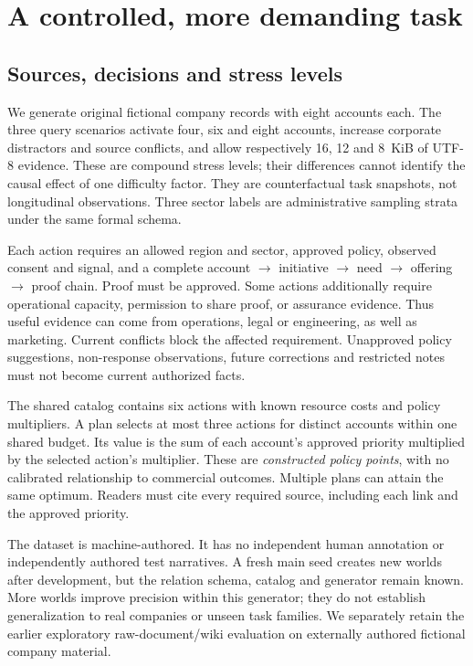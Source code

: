 \section{A controlled, more demanding task}
\subsection{Sources, decisions and stress levels}
We generate original fictional company records with eight accounts each. The three query scenarios activate four, six and eight accounts, increase corporate distractors and source conflicts, and allow respectively 16, 12 and 8~KiB of UTF-8 evidence. These are compound stress levels; their differences cannot identify the causal effect of one difficulty factor. They are counterfactual task snapshots, not longitudinal observations. Three sector labels are administrative sampling strata under the same formal schema.

Each action requires an allowed region and sector, approved policy, observed consent and signal, and a complete account $\rightarrow$ initiative $\rightarrow$ need $\rightarrow$ offering $\rightarrow$ proof chain. Proof must be approved. Some actions additionally require operational capacity, permission to share proof, or assurance evidence. Thus useful evidence can come from operations, legal or engineering, as well as marketing. Current conflicts block the affected requirement. Unapproved policy suggestions, non-response observations, future corrections and restricted notes must not become current authorized facts.

The shared catalog contains six actions with known resource costs and policy multipliers. A plan selects at most three actions for distinct accounts within one shared budget. Its value is the sum of each account's approved priority multiplied by the selected action's multiplier. These are \emph{constructed policy points}, with no calibrated relationship to commercial outcomes. Multiple plans can attain the same optimum. Readers must cite every required source, including each link and the approved priority.

The dataset is machine-authored. It has no independent human annotation or independently authored test narratives. A fresh main seed creates new worlds after development, but the relation schema, catalog and generator remain known. More worlds improve precision within this generator; they do not establish generalization to real companies or unseen task families. We separately retain the earlier exploratory raw-document/wiki evaluation on externally authored fictional company material.

